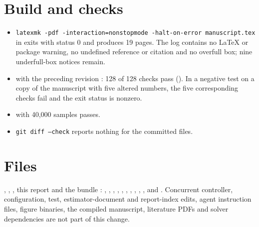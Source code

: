 \documentclass[11pt]{article}
\begin{document}
\section{Build and checks}
\begin{itemize}
\item \texttt{latexmk -pdf -interaction=nonstopmode -halt-on-error
manuscript.tex} in  exits with status 0 and produces 19 pages.
The log contains no LaTeX or package warning, no undefined reference or
citation and no overfull box; nine underfull-box notices remain.
\item {} with the preceding revision
: 128 of 128 checks pass
(). In a negative test on a copy of the manuscript with
five altered numbers, the five corresponding checks fail and the exit
status is nonzero.
\item {} with 40,000 samples passes.
\item \texttt{git diff --check} reports nothing for the committed files.
\end{itemize}

\section{Files}
, ,
, this report and the bundle
:
, ,
, ,
, ,
, ,
, , 
and . Concurrent controller, configuration, test,
estimator-document and report-index edits, agent instruction files, figure
binaries, the compiled manuscript, literature PDFs and solver dependencies
are not part of this change.
\end{document}
